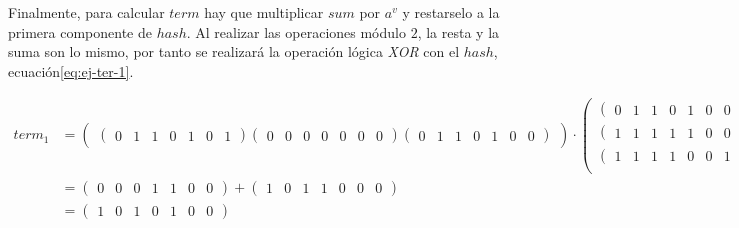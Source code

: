 Finalmente, para calcular $term$ hay que multiplicar $sum$ por $a^v$ y restarselo a la primera componente de $hash$. Al realizar las operaciones módulo $2$, la resta y la suma son lo mismo, por tanto se realizará la operación lógica \textit{XOR} con el $hash$, ecuación\ref{eq:ej-ter-1}.

\begin{equation}\label{eq:ej-ter-1}
	\begin{split}
	{term_1} &= 
		\left(\begin{matrix}
			\left(\begin{smallmatrix}0 & 1 & 1 & 0 & 1 & 0 & 1\end{smallmatrix}\right)			
			\left(\begin{smallmatrix}0 & 0 & 0 & 0 & 0 & 0 & 0\end{smallmatrix}\right)
			\left(\begin{smallmatrix}0 & 1 & 1 & 0 & 1 & 0 & 0\end{smallmatrix}\right)
		\end{matrix}\right) \cdot 
		\left(\begin{matrix}
			\left(\begin{smallmatrix}0 & 1 & 1 & 0 & 1 & 0 & 0\end{smallmatrix}\right)\\
			\left(\begin{smallmatrix}1 & 1 & 1 & 1 & 1 & 0 & 0\end{smallmatrix}\right)\\
			\left(\begin{smallmatrix}1 & 1 & 1 & 1 & 0 & 0 & 1\end{smallmatrix}\right)\\
		\end{matrix}\right)
		+ \left(\begin{smallmatrix}1 & 0 & 1 & 1 & 0 & 0 & 0\end{smallmatrix}\right)\\
		&= \left(\begin{smallmatrix}0 & 0 & 0 & 1 & 1 & 0 & 0\end{smallmatrix}\right) + 
		\left(\begin{smallmatrix}1 & 0 & 1 & 1 & 0 & 0 & 0\end{smallmatrix}\right)\\
		& = \left(\begin{smallmatrix}1 & 0 & 1 & 0 & 1 & 0 & 0\end{smallmatrix}\right)
	\end{split}
\end{equation}

